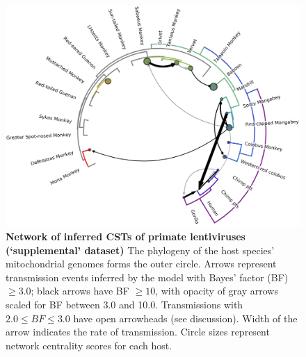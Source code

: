 \begin{figure}[h!]
  \begin{centering}
    \includegraphics[width=.8\linewidth]{./png/siv_suppdata_cst.png}
  	\caption[Network of inferred CSTs of primate lentiviruses (`supplemental' dataset)]{\textbf{Network of inferred CSTs of primate lentiviruses (`supplemental' dataset) }
    The phylogeny of the host species' mitochondrial genomes forms the outer circle.
    Arrows represent transmission events inferred by the model with Bayes' factor (BF) $\geq 3.0$; black arrows have BF $\geq 10$, with opacity of gray arrows scaled for BF between 3.0 and 10.0.
    Transmissions with $2.0 \leq BF \leq 3.0$ have open arrowheads (see discussion).
    Width of the arrow indicates the rate of transmission.
    Circle sizes represent network centrality scores for each host.
        }
  	\label{siv_suppdata_cst}
  \end{centering}
\end{figure}


